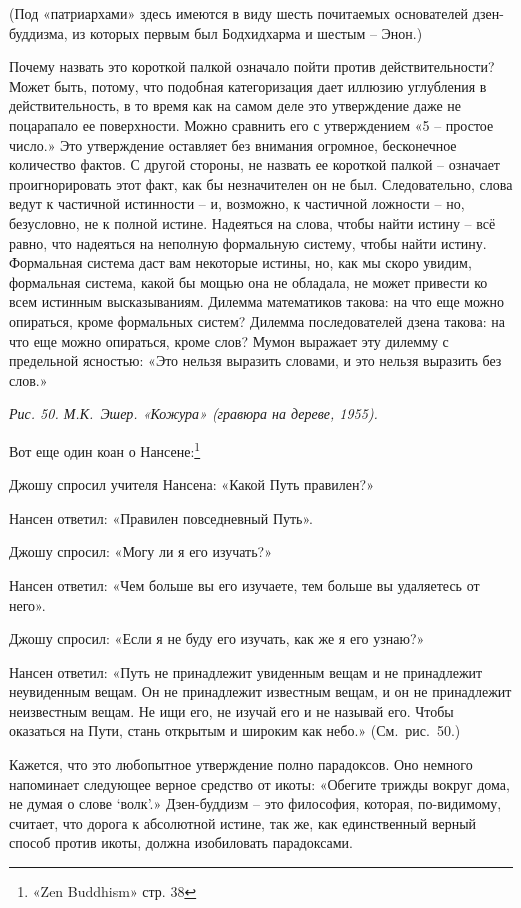 \documentclass[../main.tex]{subfiles}
\begin{document}
(Под «патриархами» здесь имеются в виду шесть почитаемых основателей дзен-буддизма, из которых первым был Бодхидхарма и шестым \--- Энон.)

Почему назвать это короткой палкой означало пойти против действительности? Может быть, потому, что подобная категоризация дает иллюзию углубления в действительность, в то время как на самом деле это утверждение даже не поцарапало ее поверхности. Можно сравнить его с утверждением «5 \--- простое число.» Это утверждение оставляет без внимания огромное, бесконечное количество фактов. С другой стороны, не назвать ее короткой палкой \--- означает проигнорировать этот факт, как бы незначителен он не был. Следовательно, слова ведут к частичной истинности \--- и, возможно, к частичной ложности \--- но, безусловно, не к полной истине. Надеяться на слова, чтобы найти истину \--- всё равно, что надеяться на неполную формальную систему, чтобы найти истину. Формальная система даст вам некоторые истины, но, как мы скоро увидим, формальная система, какой бы мощью она не обладала, не может привести ко всем истинным высказываниям. Дилемма математиков такова: на что еще можно опираться, кроме формальных систем? Дилемма последователей дзена такова: на что еще можно опираться, кроме слов? Мумон выражает эту дилемму с предельной ясностью: «Это нельзя выразить словами, и это нельзя выразить без слов.»

\emph{Рис. 50. М.К.~Эшер. «Кожура» (гравюра на дереве, 1955).}

Вот еще один коан о Нансене:\footnote{«Zen Buddhism» стр. 38}

\begin{koan}
    Джошу спросил учителя Нансена: «Какой Путь правилен?»

    Нансен ответил: «Правилен повседневный Путь».

    Джошу спросил: «Могу ли я его изучать?»

    Нансен ответил: «Чем больше вы его изучаете, тем больше вы удаляетесь от него».

    Джошу спросил: «Если я не буду его изучать, как же я его узнаю?»

    Нансен ответил: «Путь не принадлежит увиденным вещам и не принадлежит неувиденным вещам. Он не принадлежит известным вещам, и он не принадлежит неизвестным вещам. Не ищи его, не изучай его и не называй его. Чтобы оказаться на Пути, стань открытым и широким как небо.» (См.~рис.~50.)
\end{koan}

Кажется, что это любопытное утверждение полно парадоксов. Оно немного напоминает следующее верное средство от икоты: «Обегите трижды вокруг дома, не думая о слове \enquote*{волк}.» Дзен-буддизм \--- это философия, которая, по-видимому, считает, что дорога к абсолютной истине, так же, как единственный верный способ против икоты, должна изобиловать парадоксами.
\end{document}

